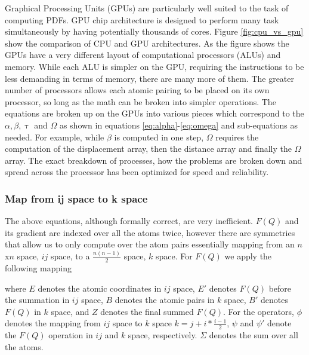 Graphical Processing Units (GPUs) are particularly well suited to the task of computing PDFs.
GPU chip architecture is designed to perform many task simultaneously by having potentially thousands of cores.
Figure \ref{fig:cpu_vs_gpu} show the comparison of CPU and GPU architectures.
As the figure shows the GPUs have a very different layout of computational processors (ALUs) and memory.
While each ALU is simpler on the GPU, requiring the instructions to be less demanding in terms of memory, there are many more of them.
The greater number of processors allows each atomic pairing to be placed on its own processor, so long as the math can be broken into simpler operations.
The equations are broken up on the GPUs into various pieces which correspond to the $\alpha, \beta, \uptau$ and $\Omega$ as shown in equations \ref{eq:alpha}-\ref{eq:omega} and sub-equations as needed.
For example, while $\beta$ is computed in one step, $\Omega$ requires the computation of the displacement array, then the distance array and finally the $\Omega$ array.
The exact breakdown of processes, how the problems are broken down and spread across the processor has been optimized for speed and reliability.

\subsubsection{Map from ij space to k space}
The above equations, although formally correct, are very inefficient. $F(Q)$ and its gradient are indexed over all the atoms twice, however there are symmetries that allow us to only compute over the atom pairs essentially mapping from an $n$x$n$ space, $ij$ space, to a $\frac{n(n-1)}{2}$ space, $k$ space.
For $F(Q)$ we apply the following mapping
\begin{figure}[!ht]
\begin{center}
\end{center}
\end{figure}
where $E$ denotes the atomic coordinates in $ij$ space, $E'$ denotes $F(Q)$ before the summation in $ij$ space, $B$ denotes the atomic pairs in $k$ space, $B'$ denotes $F(Q)$ in $k$ space, and $Z$ denotes the final summed $F(Q)$.  For the operators, $\phi$ denotes the mapping from $ij$ space to $k$ space $k = j + i * \frac{i - 1}{2}$, $\psi$ and $\psi'$ denote the $F(Q)$ operation in $ij$ and $k$ space, respectively. $\Sigma$ denotes the sum over all the atoms.

